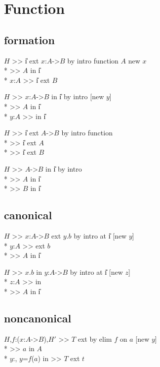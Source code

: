 \section{Function}
\subsection*{formation}
\goal $H$ >> \U{i} ext $x$:$A$->$B$ by intro function $A$ new $x$ \\*
\subgoal >> $A$ in \U{i} \\*
\subgoal $x$:$A$ >> \U{i} ext $B$


\goalskip

\goal $H$ >> $x$:$A$->$B$ in \U{i} by intro [new $y$] \\*
\subgoal >> $A$ in \U{i} \\*
\subgoal $y$:$A$ >>  in \U{i}

\goalskip

\goal $H$ >> \U{i} ext $A$->$B$ by intro function \\*
\subgoal >> \U{i} ext $A$ \\*
\subgoal >> \U{i} ext $B$


\goalskip

\goal $H$ >> $A$->$B$ in \U{i} by intro \\*
\subgoal >> $A$ in \U{i} \\*
\subgoal >> $B$ in \U{i}

\subsection*{canonical}
\goal $H$ >> $x$:$A$->$B$ ext \bs$y$.$b$ by intro at \U{i} [new $y$] \\*
\subgoal $y$:$A$ >>  ext $b$ \\*
\subgoal >> $A$ in \U{i}


\goalskip

\goal $H$ >> \bs $x$.$b$ in $y$:$A$->$B$ by intro at \U{i} [new $z$] \\*
\subgoal $z$:$A$ >>  in  \\*
\subgoal >> $A$ in \U{i}

\subsection*{noncanonical}
\goal $H$,$f$:($x$:$A$->$B$),$H'$ >> $T$ ext 
              by elim $f$ on $a$ [new $y$] \\*
\subgoal >> $a$ in $A$ \\*
\subgoal $y$:,
             $y$=$f$($a$) in  >> $T$ ext $t$



